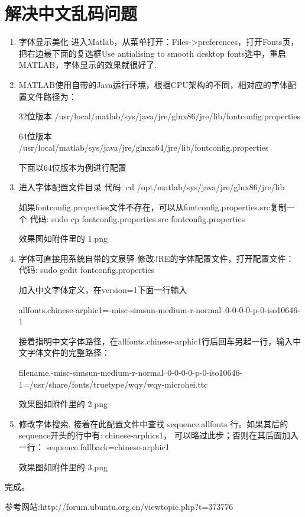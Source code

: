 \documentclass[a4paper,12pt]{article}
\begin{document}
\section{解决中文乱码问题}

\begin{enumerate}

\item 字体显示美化  进入Matlab，从菜单打开：Files->preferences，打开Fonts页，把右边最下面的复选框Use  antialising  to  smooth  desktop  fonts选中，重启MATLAB，字体显示的效果就很好了.

\item MATLAB使用自带的Java运行环境，根据CPU架构的不同，相对应的字体配置文件路径为：

32位版本  /usr/local/matlab/sys/java/jre/glnx86/jre/lib/fontconfig.properties

64位版本  /usr/local/matlab/sys/java/jre/glnxa64/jre/lib/fontconfig.properties

下面以64位版本为例进行配置

\item 进入字体配置文件目录
代码:
cd  /opt/matlab/sys/java/jre/glnx86/jre/lib

如果fontconfig.properties文件不存在，可以从fontconfig.properties.src复制一个
代码:
sudo  cp  fontconfig.properties.src  fontconfig.properties

效果图如附件里的  1.png

\item 字体可直接用系统自带的文泉驿
修改JRE的字体配置文件，打开配置文件：
代码:
  sudo  gedit  fontconfig.properties

加入中文字体定义，在version=1下面一行输入

allfonts.chinese-arphic1=-misc-simsun-medium-r-normal--0-0-0-0-p-0-iso10646-1

接着指明中文字体路径，在allfonts.chinese-arphic1行后回车另起一行，输入中文字体文件的完整路径：

filename.-misc-simsun-medium-r-normal--0-0-0-0-p-0-iso10646-1=/usr/share/fonts/truetype/wqy/wqy-microhei.ttc

效果图如附件里的  2.png

\item 修改字体搜索,  接着在此配置文件中查找  sequence.allfonts  行。如果其后的sequence开头的行中有:  chinese-arphics1，  可以略过此步；否则在其后面加入一行：  sequence.fallback=chinese-arphic1

效果图如附件里的  3.png

\end{enumerate}

完成。

参考网站:http://forum.ubuntu.org.cn/viewtopic.php?t=373776
\end{document}
